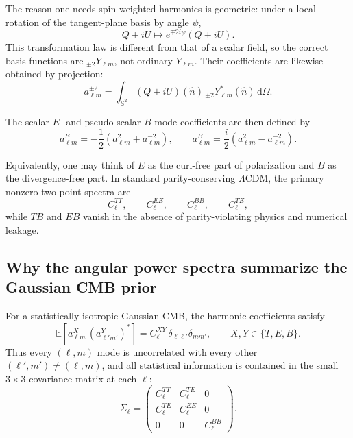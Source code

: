 \documentclass[11pt]{article}
\newcommand{\EE}{\mathbb{E}}
\newcommand{\dd}{\mathrm{d}}
\begin{document}
The reason one needs spin-weighted harmonics is geometric: under a local rotation of the tangent-plane basis by angle \(\psi\),
\begin{equation}
  Q \pm iU \longmapsto e^{\mp 2i\psi}(Q \pm iU).
\end{equation}
This transformation law is different from that of a scalar field, so the correct basis functions are \({}_{\pm 2}Y_{\ell m}\), not ordinary \(Y_{\ell m}\). Their coefficients are likewise obtained by projection:
\begin{equation}
  a_{\ell m}^{\pm 2}
  =
  \int_{\mathbb S^2}
  (Q\pm iU)(\hat n)\,{}_{\pm 2}Y_{\ell m}^\ast(\hat n)\,\dd\Omega.
\end{equation}

The scalar \(E\)- and pseudo-scalar \(B\)-mode coefficients are then defined by \cite{zaldarriaga1997,kamionkowski1997}
\begin{equation}
  a_{\ell m}^E = -\frac12\left(a_{\ell m}^{2}+a_{\ell m}^{-2}\right),
  \qquad
  a_{\ell m}^B = \frac{i}{2}\left(a_{\ell m}^{2}-a_{\ell m}^{-2}\right).
\end{equation}

Equivalently, one may think of \(E\) as the curl-free part of polarization and \(B\) as the divergence-free part. In standard parity-conserving \(\Lambda\)CDM, the primary nonzero two-point spectra are
\begin{equation}
  C_\ell^{TT},\qquad C_\ell^{EE},\qquad C_\ell^{BB},\qquad C_\ell^{TE},
\end{equation}
while \(TB\) and \(EB\) vanish in the absence of parity-violating physics and numerical leakage.

\subsection{Why the angular power spectra summarize the Gaussian CMB prior}

For a statistically isotropic Gaussian CMB, the harmonic coefficients satisfy
\begin{equation}
  \EE\!\left[a_{\ell m}^X\,(a_{\ell' m'}^Y)^\ast\right]
  =
  C_\ell^{XY}\,\delta_{\ell\ell'}\delta_{mm'},
  \qquad
  X,Y\in\{T,E,B\}.
\end{equation}
Thus every \((\ell,m)\) mode is uncorrelated with every other \((\ell',m')\neq(\ell,m)\), and all statistical information is contained in the small \(3\times 3\) covariance matrix at each \(\ell\):
\begin{equation}
  \Sigma_\ell
  =
  \begin{pmatrix}
    C_\ell^{TT} & C_\ell^{TE} & 0\\
    C_\ell^{TE} & C_\ell^{EE} & 0\\
    0 & 0 & C_\ell^{BB}
  \end{pmatrix}.
\end{equation}
\end{document}
